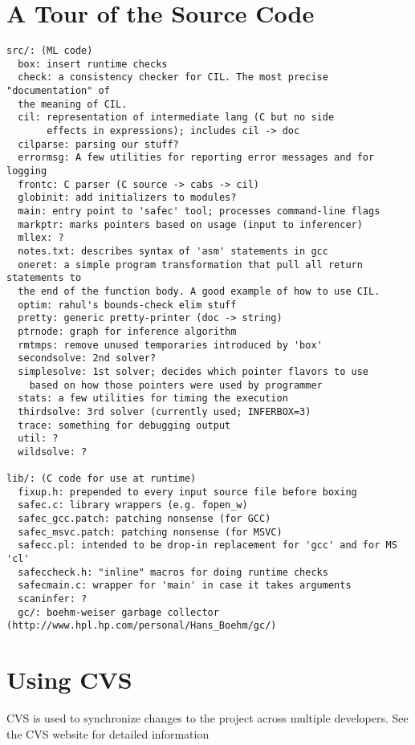 \documentclass{book}
\begin{document}
\chapter{A Tour of the Source Code}
\begin{verbatim}
src/: (ML code)
  box: insert runtime checks
  check: a consistency checker for CIL. The most precise "documentation" of
  the meaning of CIL.
  cil: representation of intermediate lang (C but no side
       effects in expressions); includes cil -> doc
  cilparse: parsing our stuff?
  errormsg: A few utilities for reporting error messages and for logging
  frontc: C parser (C source -> cabs -> cil)
  globinit: add initializers to modules?
  main: entry point to 'safec' tool; processes command-line flags
  markptr: marks pointers based on usage (input to inferencer)
  mllex: ?
  notes.txt: describes syntax of 'asm' statements in gcc
  oneret: a simple program transformation that pull all return statements to
  the end of the function body. A good example of how to use CIL.
  optim: rahul's bounds-check elim stuff
  pretty: generic pretty-printer (doc -> string)
  ptrnode: graph for inference algorithm
  rmtmps: remove unused temporaries introduced by 'box'
  secondsolve: 2nd solver?
  simplesolve: 1st solver; decides which pointer flavors to use
    based on how those pointers were used by programmer
  stats: a few utilities for timing the execution
  thirdsolve: 3rd solver (currently used; INFERBOX=3)
  trace: something for debugging output
  util: ?
  wildsolve: ?

lib/: (C code for use at runtime)
  fixup.h: prepended to every input source file before boxing
  safec.c: library wrappers (e.g. fopen_w)
  safec_gcc.patch: patching nonsense (for GCC)
  safec_msvc.patch: patching nonsense (for MSVC)
  safecc.pl: intended to be drop-in replacement for 'gcc' and for MS 'cl'
  safeccheck.h: "inline" macros for doing runtime checks
  safecmain.c: wrapper for 'main' in case it takes arguments
  scaninfer: ?
  gc/: boehm-weiser garbage collector (http://www.hpl.hp.com/personal/Hans_Boehm/gc/)
\end{verbatim}


\chapter{Using CVS}
CVS is used to synchronize changes to the project across multiple
developers.  See the CVS website for detailed information

  
\end{document}
